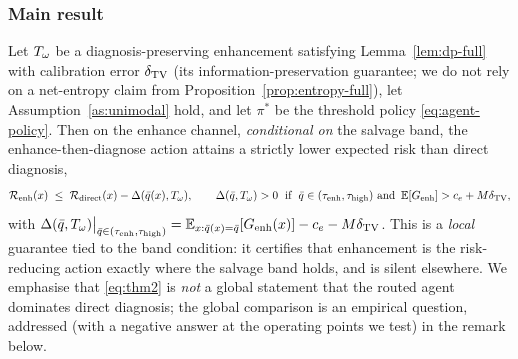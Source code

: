 \subsubsection{Main result}\label{app:a2-thm2-main}
\begin{theorem}\label{thm:agent}
Let $T_\omega$ be a diagnosis-preserving enhancement satisfying Lemma~\ref{lem:dp-full} with
calibration error $\delta_{\mathrm{TV}}$ (its information-preservation guarantee; we do not rely on a
net-entropy claim from Proposition~\ref{prop:entropy-full}), let
Assumption~\ref{as:unimodal} hold, and let $\pi^{*}$ be the threshold policy
\eqref{eq:agent-policy}. Then on the enhance channel, \emph{conditional on} the salvage band,
the enhance-then-diagnose action attains a strictly lower expected risk than direct diagnosis,
\begin{equation}
\mathcal{R}_{\mathrm{enh}}(x) \;\leq\; \mathcal{R}_{\mathrm{direct}}(x) - \Delta(\bar{q}(x),T_\omega),
\qquad
\Delta(\bar{q},T_\omega) > 0 \;\text{ if }\; \bar{q}\in(\tau_{\mathrm{enh}},\tau_{\mathrm{high}})
\text{ and } \operatorname*{\mathbb{E}}[G_{\mathrm{enh}}]>c_e+M\delta_{\mathrm{TV}},
\label{eq:thm2}
\end{equation}
with
$\Delta(\bar{q},T_\omega)\big|_{\bar{q}\in(\tau_{\mathrm{enh}},\tau_{\mathrm{high}})}
= \operatorname*{\mathbb{E}}_{x:\bar{q}(x)=\bar{q}}[G_{\mathrm{enh}}(x)] - c_e - M\delta_{\mathrm{TV}}$.
This is a \emph{local} guarantee tied to the band condition: it certifies that enhancement is
the risk-reducing action exactly where the salvage band holds, and is silent elsewhere. We
emphasise that \eqref{eq:thm2} is \emph{not} a global statement that the routed agent
dominates direct diagnosis; the global comparison is an empirical question, addressed (with a
negative answer at the operating points we test) in the remark below.
\end{theorem}
